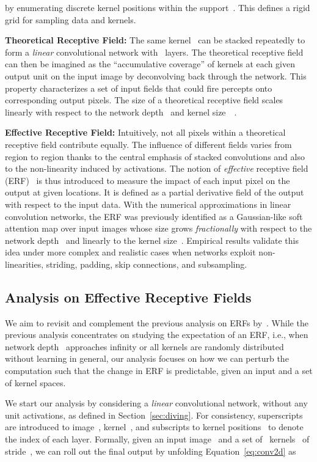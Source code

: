 \documentclass{article} \usepackage{iclr2020_conference, times}
\newcommand{\bfsection}[1]{\noindent\textbf{#1:}}
\begin{document}
by enumerating discrete kernel positions  within the support~. This defines a rigid grid for sampling data and kernels.

\bfsection{Theoretical Receptive Field}
The same kernel~ can be stacked repeatedly to
form a \textit{linear} convolutional network with~ layers.
The theoretical receptive field can then be imagined as the ``accumulative
coverage'' of kernels at each given output unit on the input image by
deconvolving back through the network.
This property characterizes a set of input fields that could fire
percepts onto corresponding output pixels.
The size of a theoretical receptive field scales linearly with respect to the
network depth~ and kernel size~~\citep{he2016deep}.

\bfsection{Effective Receptive Field}
Intuitively, not all pixels within a theoretical receptive field contribute
equally.
The influence of different fields varies from region to region
thanks to the central emphasis of stacked convolutions and also to the non-linearity induced
by activations.
The notion of \textit{effective} receptive field
(ERF)~\citep{luo2016understanding} is thus introduced to measure the
impact of each input pixel on the output at given locations.
It is defined as a partial derivative field of the output with respect to the input
data.
With the numerical approximations in linear convolution networks, the ERF was
previously identified as a Gaussian-like soft attention map over input images
whose size grows \textit{fractionally} with respect to the network depth~ and linearly to the kernel size~.
Empirical results validate this idea under more complex and
realistic cases when networks exploit non-linearities, striding, padding, skip
connections, and subsampling.


\subsection{Analysis on Effective Receptive Fields} \label{sec:analyzing}

We aim to revisit and complement the previous analysis on ERFs
by~\citet{luo2016understanding}.
While the previous analysis concentrates on studying the expectation of an ERF,
i.e., when network depth~ approaches infinity or all kernels are randomly
distributed without learning in general, our analysis focuses on how we can
perturb the computation such that the change in ERF is predictable,
given an input and a set of kernel spaces.\

We start our analysis by considering a \textit{linear} convolutional
network, without any unit activations, as defined in Section~\ref{sec:diving}.
For consistency, superscripts are introduced to image~, kernel~, and
subscripts to kernel positions~ to denote the index  of each
layer.
Formally, given an input image~ and a set of~
kernels~ of stride~, we can roll out the final
output  by unfolding Equation~\ref{eq:conv2d} as
\end{document}
